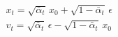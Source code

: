 \documentclass[border=3pt]{standalone}
\begin{document}
$\displaystyle\begin{gathered}
x_t=\sqrt{\bar\alpha_t}\,x_0+\sqrt{1-\bar\alpha_t}\,\epsilon \\[9pt]
v_t=\sqrt{\bar\alpha_t}\,\epsilon-\sqrt{1-\bar\alpha_t}\,x_0
\end{gathered}$
\end{document}
